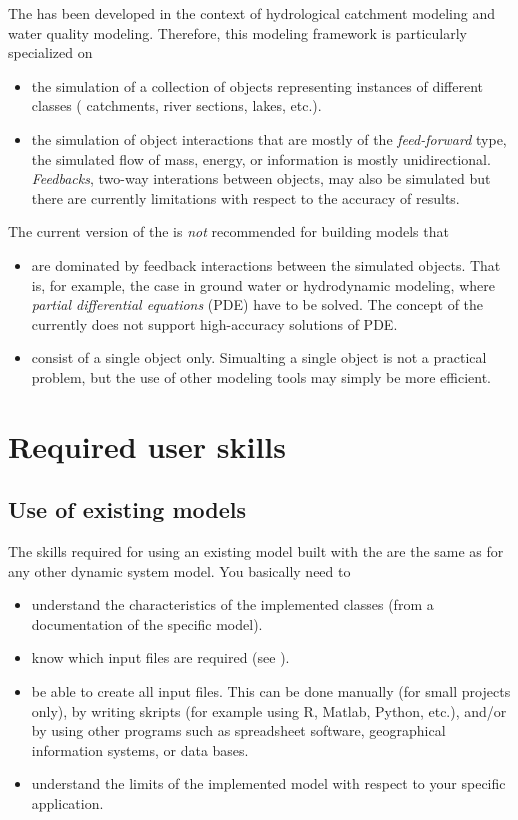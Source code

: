 The  has been developed in the context of hydrological catchment modeling and water quality modeling. Therefore, this modeling framework is particularly specialized on
\begin{itemize}
  \item the simulation of a collection of objects representing instances of different classes (\eg{} catchments, river sections, lakes, etc.).
  \item the simulation of object interactions that are mostly of the \emph{feed-forward} type, \ie{} the simulated flow of mass, energy, or information is mostly unidirectional. \emph{Feedbacks}, \ie{} two-way interations between objects, may also be simulated but there are currently limitations with respect to the accuracy of results.
\end{itemize}

The current version of the  is \emph{not} recommended for building models that
\begin{itemize}
  \item are dominated by feedback interactions between the simulated objects. That is, for example, the case in ground water or hydrodynamic modeling, where \emph{partial differential equations} (PDE) have to be solved. The concept of the  currently does not support high-accuracy solutions of PDE.
  \item consist of a single object only. Simualting a single object is not a practical problem, but the use of other modeling tools may simply be more efficient.
\end{itemize}

\section{Required user skills} \label{sec:intro_skills}

\subsection{Use of existing models} \label{sec:intro_skills-use}

The skills required for using an existing model built with the  are the same as for any other dynamic system model. You basically need to
\begin{itemize}
  \item understand the characteristics of the implemented classes (from a documentation of the specific model).
  \item know which input files are required (see ).
  \item be able to create all input files. This can be done manually (for small projects only), by writing skripts (for example using R, Matlab, Python, etc.), and/or by using other programs such as spreadsheet software, geographical information systems, or data bases.
  \item understand the limits of the implemented model with respect to your specific application.
\end{itemize}

